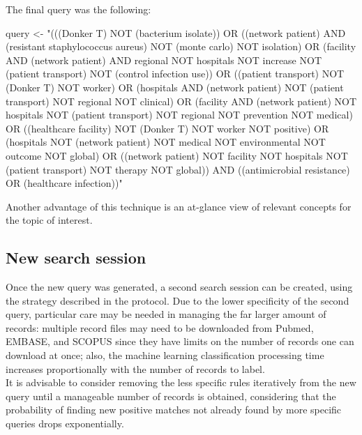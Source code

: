 \documentclass[
]{article}
\newenvironment{Shaded}{\begin{snugshade}}{\end{snugshade}}
\newcommand{\NormalTok}[1]{#1}
\newcommand{\OtherTok}[1]{\textcolor[rgb]{0.56,0.35,0.01}{#1}}
\newcommand{\StringTok}[1]{\textcolor[rgb]{0.31,0.60,0.02}{#1}}
\begin{document}
The final query was the following:

\begin{Shaded}
\begin{Highlighting}[]
\NormalTok{query }\OtherTok{\textless{}{-}} \StringTok{"(((Donker T) NOT (bacterium isolate)) OR ((network patient) AND}
\StringTok{(resistant staphylococcus aureus) NOT (monte carlo) NOT isolation) OR}
\StringTok{(facility AND (network patient) AND regional NOT hospitals NOT increase NOT}
\StringTok{(patient transport) NOT (control infection use)) OR ((patient transport) NOT}
\StringTok{(Donker T) NOT worker) OR (hospitals AND (network patient) NOT}
\StringTok{(patient transport) NOT regional NOT clinical) OR (facility AND}
\StringTok{(network patient) NOT hospitals NOT (patient transport) NOT regional NOT}
\StringTok{prevention NOT medical) OR ((healthcare facility) NOT (Donker T) NOT}
\StringTok{worker NOT positive) OR (hospitals NOT (network patient) NOT medical NOT}
\StringTok{environmental NOT outcome NOT global) OR ((network patient) NOT facility NOT}
\StringTok{hospitals NOT (patient transport) NOT therapy NOT global)) AND}
\StringTok{((antimicrobial resistance) OR (healthcare infection))"}
\end{Highlighting}
\end{Shaded}

Another advantage of this technique is an at-glance view of relevant
concepts for the topic of interest.

\hypertarget{new-search-session}{%
\subsection{New search session}\label{new-search-session}}

Once the new query was generated, a second search session can be
created, using the strategy described in the protocol. Due to the lower
specificity of the second query, particular care may be needed in
managing the far larger amount of records: multiple record files may
need to be downloaded from Pubmed, EMBASE, and SCOPUS since they have
limits on the number of records one can download at once; also, the
machine learning classification processing time increases proportionally
with the number of records to label.\\
It is advisable to consider removing the less specific rules iteratively
from the new query until a manageable number of records is obtained,
considering that the probability of finding new positive matches not
already found by more specific queries drops exponentially.\\
\end{document}
